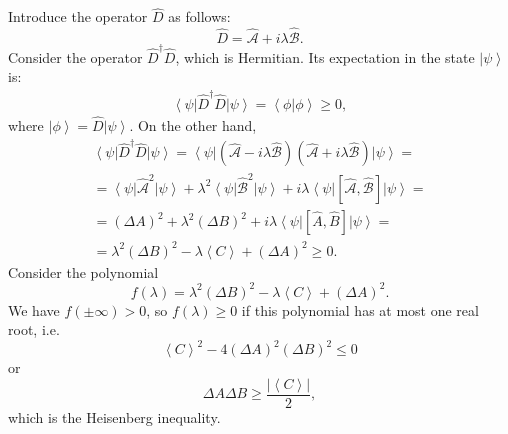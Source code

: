 Introduce the operator $\hat{D}$ as follows:
\begin{equation}
\hat{D} = \hat{\mathcal{A}} + i \lambda \hat{\mathcal{B}}.
\nonumber
\end{equation}
Consider the operator $\hat{D}^{\dag}\hat{D}$, which is Hermitian. Its expectation in the state $\left|\psi\right>$ is:
\begin{eqnarray}
\left<\psi\right|\hat{D}^{\dag}\hat{D}\left|\psi\right> = 
\left<\phi\right|\left.\phi\right> \ge 0,
\nonumber
\end{eqnarray}
where
$\left|\phi\right> = \hat{D}\left|\psi\right>$. On the other hand,
\begin{eqnarray}
\left<\psi\right|\hat{D}^{\dag}\hat{D}\left|\psi\right> = 
\left<\psi\right|\left(\hat{\mathcal{A}} - i \lambda \hat{\mathcal{B}}\right)
\left(\hat{\mathcal{A}} + i \lambda \hat{\mathcal{B}}\right)\left|\psi\right> =
\nonumber \\
=
\left<\psi\right|\hat{\mathcal{A}}^2\left|\psi\right> +
\lambda^2\left<\psi\right|\hat{\mathcal{B}}^2\left|\psi\right> +
i \lambda 
\left<\psi\right|
\left[ \mathcal{\hat{A}}, \mathcal{\hat{B}}\right]
\left|\psi\right>
 = 
\nonumber \\
=
\left(\Delta A\right)^2 + \lambda^2 \left(\Delta B\right)^2 +
i \lambda 
\left<\psi\right|
\left[ \hat{A}, \hat{B}\right]
\left|\psi\right> = 
\nonumber \\
=
\lambda^2 \left(\Delta B\right)^2 - 
\lambda \left<C\right> + \left(\Delta A\right)^2 \ge 0.
\nonumber
\end{eqnarray}
Consider the polynomial 
\[
f\left(\lambda\right) = \lambda^2 \left(\Delta B\right)^2 - 
\lambda \left<C\right> + \left(\Delta A\right)^2.
\]
We have $f\left( \pm \infty \right) > 0$, so 
$f\left(\lambda\right) \ge 0$ if this polynomial has at most one real root, i.e.
\[
\left<C\right>^2 - 4 \left(\Delta A\right)^2 \left(\Delta B\right)^2
\le 0
\]
or
\begin{equation}
  \Delta A \Delta B \ge \frac{\left|\left< C \right>\right|}{2},
  \label{eqAddHeisenbergUncertaintyPrinciple}
\end{equation}
which is the Heisenberg inequality. 

